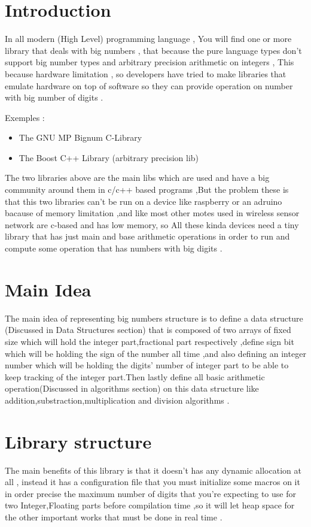 \section{Introduction}
In all modern (High Level) programming language , You will find one or more library that deals with big numbers , that because the pure language types don't support big number types and arbitrary precision arithmetic on integers , This because hardware limitation , so developers have tried to make libraries that emulate hardware on top of software so they can provide operation on number with big number of digits .\newline

Exemples : 
 \begin{itemize}
	\item The GNU MP Bignum C-Library
	\item The Boost C++ Library (arbitrary precision lib)
\end{itemize}

The two libraries above are the main libs which are used and have a big community around them in c/c++ based programs ,But the problem these is that this two libraries can't be run on a device like raspberry or an adruino bacause of memory limitation ,and like most other motes used in wireless sensor network are c-based and has low memory, so All these kinda devices need a tiny library that has just main and base arithmetic operations in order to run and compute some operation that has numbers with big digits .
\section{Main Idea}
The main idea of representing big numbers structure is to define a data structure (Discussed in Data Structures section) that is composed of two arrays of fixed size which will hold the integer part,fractional part respectively ,define sign bit which will be holding the sign of the number all time ,and also defining an integer number which will be holding the digits' number of integer part to be able to keep tracking of the integer part.Then lastly define all basic arithmetic operation(Discussed in algorithms section) on this data structure like addition,substraction,multiplication and division algorithms .
\section{Library structure}
The main benefits of this library is that it doesn't has any dynamic allocation at all , instead it has a configuration file that you must initialize some macros on it in order precise the maximum number of digits that you're expecting to use for two Integer,Floating parts before compilation time ,so it will let heap space for the other important works that must be done in real time . 

